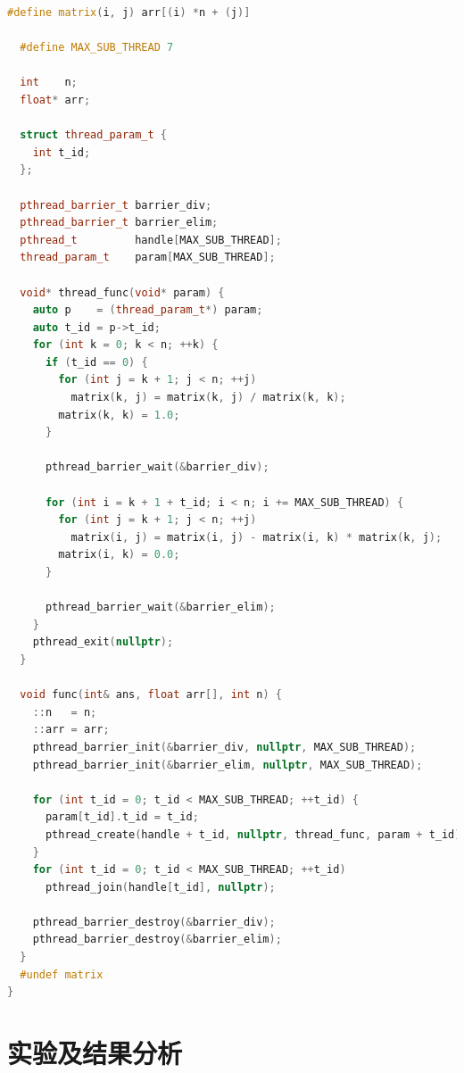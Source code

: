 \documentclass[a4paper]{article}
\begin{document}
\begin{lstlisting}[title=线程池+栅栏同步+工作线程执行除法,frame=trbl,language={C++}]
  #define matrix(i, j) arr[(i) *n + (j)]

  #define MAX_SUB_THREAD 7
  
  int    n;
  float* arr;
  
  struct thread_param_t {
    int t_id;
  };
  
  pthread_barrier_t barrier_div;
  pthread_barrier_t barrier_elim;
  pthread_t         handle[MAX_SUB_THREAD];
  thread_param_t    param[MAX_SUB_THREAD];
  
  void* thread_func(void* param) {
    auto p    = (thread_param_t*) param;
    auto t_id = p->t_id;
    for (int k = 0; k < n; ++k) {
      if (t_id == 0) {
        for (int j = k + 1; j < n; ++j)
          matrix(k, j) = matrix(k, j) / matrix(k, k);
        matrix(k, k) = 1.0;
      }
  
      pthread_barrier_wait(&barrier_div);
  
      for (int i = k + 1 + t_id; i < n; i += MAX_SUB_THREAD) {
        for (int j = k + 1; j < n; ++j)
          matrix(i, j) = matrix(i, j) - matrix(i, k) * matrix(k, j);
        matrix(i, k) = 0.0;
      }
  
      pthread_barrier_wait(&barrier_elim);
    }
    pthread_exit(nullptr);
  }
  
  void func(int& ans, float arr[], int n) {
    ::n   = n;
    ::arr = arr;
    pthread_barrier_init(&barrier_div, nullptr, MAX_SUB_THREAD);
    pthread_barrier_init(&barrier_elim, nullptr, MAX_SUB_THREAD);
  
    for (int t_id = 0; t_id < MAX_SUB_THREAD; ++t_id) {
      param[t_id].t_id = t_id;
      pthread_create(handle + t_id, nullptr, thread_func, param + t_id);
    }
    for (int t_id = 0; t_id < MAX_SUB_THREAD; ++t_id)
      pthread_join(handle[t_id], nullptr);
  
    pthread_barrier_destroy(&barrier_div);
    pthread_barrier_destroy(&barrier_elim);
  }
  #undef matrix
}
\end{lstlisting}

\section{实验及结果分析}




% 
% 
\end{document}
